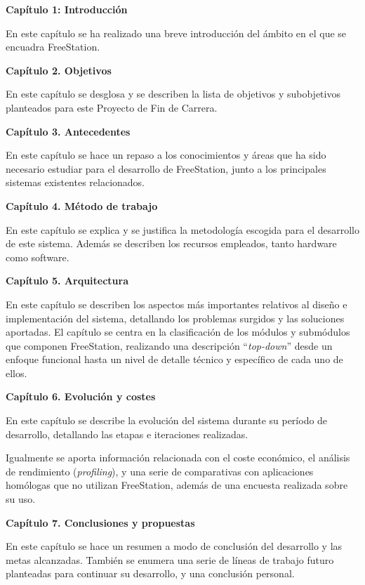 \textbf{Capítulo 1: Introducción}

En este capítulo se ha realizado una breve introducción del ámbito en el que se encuadra
FreeStation.

\newpage

\textbf{Capítulo 2. Objetivos}

En este capítulo se desglosa y se describen la lista de objetivos y subobjetivos
planteados para este Proyecto de Fin de Carrera.

\textbf{Capítulo 3. Antecedentes}

En este capítulo se hace un repaso a los conocimientos y áreas que ha sido
necesario estudiar para el desarrollo de FreeStation, junto a los principales
sistemas existentes relacionados.

\textbf{Capítulo 4. Método de trabajo}

En este capítulo se explica y se justifica la metodología escogida para el
desarrollo de este sistema. Además se describen los recursos empleados, tanto
hardware como software.

\textbf{Capítulo 5. Arquitectura}

En este capítulo se describen los aspectos más importantes relativos al diseño e
implementación del sistema, detallando los problemas surgidos y las soluciones
aportadas. El capítulo se centra en la clasificación de los módulos y submódulos
que componen FreeStation, realizando una descripción ``\emph{top-down}'' desde un
enfoque funcional hasta un nivel de detalle técnico y específico de cada uno de
ellos.

\textbf{Capítulo 6. Evolución y costes}

En este capítulo se describe la evolución del sistema durante su período de
desarrollo, detallando las etapas e iteraciones realizadas.

Igualmente se aporta información relacionada con el coste económico, el análisis
de rendimiento (\emph{profiling}), y una serie de comparativas con aplicaciones
homólogas que no utilizan FreeStation, además de una encuesta realizada sobre su
uso.

\newpage

\textbf{Capítulo 7. Conclusiones y propuestas}

En este capítulo se hace un resumen a modo de conclusión del desarrollo y las
metas alcanzadas. También se enumera una serie de líneas de trabajo futuro planteadas
para continuar su desarrollo, y una conclusión personal.

\newpage
\thispagestyle{empty}